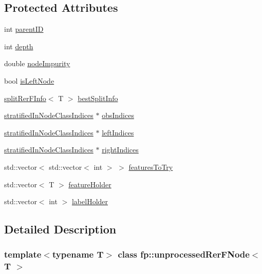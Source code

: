 \subsection*{Protected Attributes}
\begin{DoxyCompactItemize}
\item 
int \hyperlink{classfp_1_1unprocessedRerFNode_ab87cfcf5df700dbc7ec02c87057b27aa}{parent\+ID}
\item 
int \hyperlink{classfp_1_1unprocessedRerFNode_ad54ee9ea4003179b8304afb4f20d3a84}{depth}
\item 
double \hyperlink{classfp_1_1unprocessedRerFNode_a5d7bc15c3a0717abefc4845aec168167}{node\+Impurity}
\item 
bool \hyperlink{classfp_1_1unprocessedRerFNode_a75fe4b426a6a1cc8bb1de50380dcec94}{is\+Left\+Node}
\item 
\hyperlink{classfp_1_1splitRerFInfo}{split\+Rer\+F\+Info}$<$ T $>$ \hyperlink{classfp_1_1unprocessedRerFNode_acf98051b30cb1c0f2e62bb7df51c0884}{best\+Split\+Info}
\item 
\hyperlink{classfp_1_1stratifiedInNodeClassIndices}{stratified\+In\+Node\+Class\+Indices} $\ast$ \hyperlink{classfp_1_1unprocessedRerFNode_ad52d9d508bf378bc793b8cf961163735}{obs\+Indices}
\item 
\hyperlink{classfp_1_1stratifiedInNodeClassIndices}{stratified\+In\+Node\+Class\+Indices} $\ast$ \hyperlink{classfp_1_1unprocessedRerFNode_ae402805c487d29fa6d0b8fb6f873a4d3}{left\+Indices}
\item 
\hyperlink{classfp_1_1stratifiedInNodeClassIndices}{stratified\+In\+Node\+Class\+Indices} $\ast$ \hyperlink{classfp_1_1unprocessedRerFNode_a4cc97ffcfe51937766fed926bbc4892a}{right\+Indices}
\item 
std\+::vector$<$ std\+::vector$<$ int $>$ $>$ \hyperlink{classfp_1_1unprocessedRerFNode_aa2028578f341c8f41cf000eb40d228f2}{features\+To\+Try}
\item 
std\+::vector$<$ T $>$ \hyperlink{classfp_1_1unprocessedRerFNode_a09fa17210a5916239cba6716c636cc4e}{feature\+Holder}
\item 
std\+::vector$<$ int $>$ \hyperlink{classfp_1_1unprocessedRerFNode_a9e1a9728861a19034c9b17d5eaa2891d}{label\+Holder}
\end{DoxyCompactItemize}


\subsection{Detailed Description}
\subsubsection*{template$<$typename T$>$\newline
class fp\+::unprocessed\+Rer\+F\+Node$<$ T $>$}



